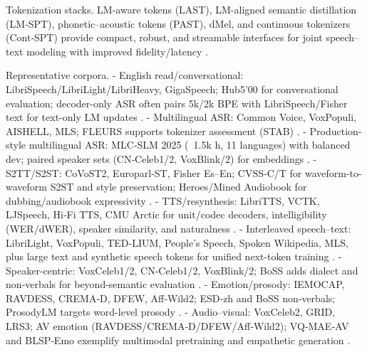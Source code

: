 Tokenization stacks. LM-aware tokens (LAST), LM-aligned semantic distillation (LM‑SPT), phonetic–acoustic tokens (PAST), dMel, and continuous tokenizers (Cont‑SPT) provide compact, robust, and streamable interfaces for joint speech–text modeling with improved fidelity/latency \cite{turetzky2024lastlanguagemodelawarespeechtokenization,jo2025lmsptalignedsemanticdistillationspeechto,har-tuv2025pastphoneticacousticspeechtokenizer,li2025continuousspeechtokenizertext,bai2025dmelspeechtokenizationmadesimple}.

Representative corpora.
- English read/conversational: LibriSpeech/LibriLight/LibriHeavy, GigaSpeech; Hub5’00 for conversational evaluation; decoder-only ASR often pairs 5k/2k BPE with LibriSpeech/Fisher text for text-only LM updates \cite{tsunoo2024decoderonlyarchitecturespeechrecognition}.
- Multilingual ASR: Common Voice, VoxPopuli, AISHELL, MLS; FLEURS supports tokenizer assessment (STAB) \cite{vashishth2024stabspeechtokenizerassessmentbenchmark}.
- Production-style multilingual ASR: MLC‑SLM 2025 (~1.5k h, 11 languages) with balanced dev; paired speaker sets (CN‑Celeb1/2, VoxBlink/2) for embeddings \cite{li2025seewossubmissionmlcslmlessonslearnedspee}.
- S2TT/S2ST: CoVoST2, Europarl‑ST, Fisher Es–En; CVSS‑C/T for waveform-to-waveform S2ST and style preservation; Heroes/Mined Audiobook for dubbing/audiobook expressivity \cite{peng2024mslms2stmultitaskspeechlanguagemodeltext,zhao2024textlessstreamingspeechtranslationsemant,huang2023holisticcascadesystembenchmarkhumanevalu,guo2025streamuniachievingstreamingspeechtransla}.
- TTS/resynthesis: LibriTTS, VCTK, LJSpeech, Hi‑Fi TTS, CMU Arctic for unit/codec decoders, intelligibility (WER/dWER), speaker similarity, and naturalness \cite{turetzky2024lastlanguagemodelawarespeechtokenization,wang2023slmbridgethingapbetweenspeechtextfoundat,entry2025towardjointlanguagemodelingspeechunitste}.
- Interleaved speech–text: LibriLight, VoxPopuli, TED‑LIUM, People’s Speech, Spoken Wikipedia, MLS, plus large text and synthetic speech tokens for unified next-token training \cite{zeng2024scalingspeechtextpretrainingsyntheticint,maimon2025scalinganalysisinterleavedspeechtextlang,li2025continuousspeechtokenizertext,bai2025dmelspeechtokenizationmadesimple}.
- Speaker-centric: VoxCeleb1/2, CN‑Celeb1/2, VoxBlink/2; BoSS adds dialect and non‑verbals for beyond-semantic evaluation \cite{li2025seewossubmissionmlcslmlessonslearnedspee,wang2025bossbeyondsemanticspeech}.
- Emotion/prosody: IEMOCAP, RAVDESS, CREMA‑D, DFEW, Aff‑Wild2; ESD‑zh and BoSS non‑verbals; ProsodyLM targets word-level prosody \cite{qian2025prosodylmuncoveringemergingprosodyproces,wang2025bossbeyondsemanticspeech,vashishth2024stabspeechtokenizerassessmentbenchmark}.
- Audio–visual: VoxCeleb2, GRID, LRS3; AV emotion (RAVDESS/CREMA‑D/DFEW/Aff‑Wild2); VQ‑MAE‑AV and BLSP‑Emo exemplify multimodal pretraining and empathetic generation \cite{sadok2025vectorquantizedmaskedautoencoderaudiovis,wang2024blspemotowardsempatheticlargespeechlangu}.

